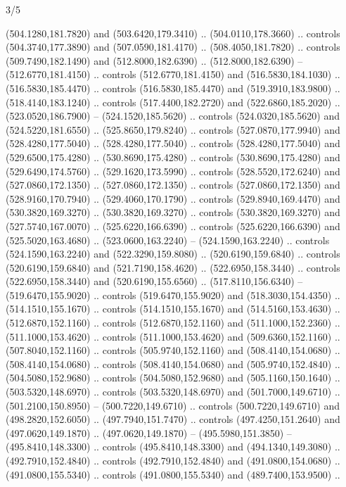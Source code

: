 \begin{flagdescription}{3/5}
\begin{scope}[shift={(0.5\flaglength,0.5\flagwidth)},scale=\flagwidth/510]
\begin{scope}[y=0.80pt, x=0.80pt, yscale=-1.06, xscale=1.06,yshift=-240pt,xshift=-400pt]
\begin{scope}[cm={{0.83333,0.0,0.0,0.83333,(154.64672,48.64761)}}]
\begin{scope}[cm={{0.93334,0.0,0.0,0.93334,(-4.86471,22.64035)}}]
  (504.1280,181.7820) and (503.6420,179.3410) .. (504.0110,178.3660) .. controls
  (504.3740,177.3890) and (507.0590,181.4170) .. (508.4050,181.7820) .. controls
  (509.7490,182.1490) and (512.8000,182.6390) .. (512.8000,182.6390) --
  (512.6770,181.4150) .. controls (512.6770,181.4150) and (516.5830,184.1030) ..
  (516.5830,185.4470) .. controls (516.5830,185.4470) and (519.3910,183.9800) ..
  (518.4140,183.1240) .. controls (517.4400,182.2720) and (522.6860,185.2020) ..
  (523.0520,186.7900) -- (524.1520,185.5620) .. controls (524.0320,185.5620) and
  (524.5220,181.6550) .. (525.8650,179.8240) .. controls (527.0870,177.9940) and
  (528.4280,177.5040) .. (528.4280,177.5040) .. controls (528.4280,177.5040) and
  (529.6500,175.4280) .. (530.8690,175.4280) .. controls (530.8690,175.4280) and
  (529.6490,174.5760) .. (529.1620,173.5990) .. controls (528.5520,172.6240) and
  (527.0860,172.1350) .. (527.0860,172.1350) .. controls (527.0860,172.1350) and
  (528.9160,170.7940) .. (529.4060,170.1790) .. controls (529.8940,169.4470) and
  (530.3820,169.3270) .. (530.3820,169.3270) .. controls (530.3820,169.3270) and
  (527.5740,167.0070) .. (525.6220,166.6390) .. controls (525.6220,166.6390) and
  (525.5020,163.4680) .. (523.0600,163.2240) -- (524.1590,163.2240) .. controls
  (524.1590,163.2240) and (522.3290,159.8080) .. (520.6190,159.6840) .. controls
  (520.6190,159.6840) and (521.7190,158.4620) .. (522.6950,158.3440) .. controls
  (522.6950,158.3440) and (520.6190,155.6560) .. (517.8110,156.6340) --
  (519.6470,155.9020) .. controls (519.6470,155.9020) and (518.3030,154.4350) ..
  (514.1510,155.1670) .. controls (514.1510,155.1670) and (514.5160,153.4630) ..
  (512.6870,152.1160) .. controls (512.6870,152.1160) and (511.1000,152.2360) ..
  (511.1000,153.4620) .. controls (511.1000,153.4620) and (509.6360,152.1160) ..
  (507.8040,152.1160) .. controls (505.9740,152.1160) and (508.4140,154.0680) ..
  (508.4140,154.0680) .. controls (508.4140,154.0680) and (505.9740,152.4840) ..
  (504.5080,152.9680) .. controls (504.5080,152.9680) and (505.1160,150.1640) ..
  (503.5320,148.6970) .. controls (503.5320,148.6970) and (501.7000,149.6710) ..
  (501.2100,150.8950) -- (500.7220,149.6710) .. controls (500.7220,149.6710) and
  (498.2820,152.6050) .. (497.7940,151.7470) .. controls (497.4250,151.2640) and
  (497.0620,149.1870) .. (497.0620,149.1870) -- (495.5980,151.3850) --
  (495.8410,148.3300) .. controls (495.8410,148.3300) and (494.1340,149.3080) ..
  (492.7910,152.4840) .. controls (492.7910,152.4840) and (491.0800,154.0680) ..
  (491.0800,155.5340) .. controls (491.0800,155.5340) and (489.7400,153.9500) ..

\end{scope}
\end{scope}
\end{scope}
\end{scope}
\end{flagdescription}
